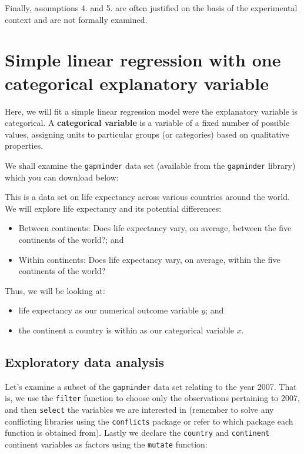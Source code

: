 \documentclass[
  letterpaper,
  DIV=11,
  numbers=noendperiod]{scrartcl}
\providecommand{\tightlist}{%
  \setlength{\itemsep}{0pt}\setlength{\parskip}{0pt}}\usepackage{longtable,booktabs,array}
\begin{document}
Finally, assumptions 4. and 5. are often justified on the basis of the
experimental context and are not formally examined.

\section{Simple linear regression with one categorical explanatory
variable}\label{simple-linear-regression-with-one-categorical-explanatory-variable}

Here, we will fit a simple linear regression model were the explanatory
variable is categorical. A \textbf{categorical variable} is a variable
of a fixed number of possible values, assigning units to particular
groups (or categories) based on qualitative properties.

We shall examine the \texttt{gapminder} data set (available from the
\texttt{gapminder} library) which you can download below:

This is a data set on life expectancy across various countries around
the world. We will explore life expectancy and its potential
differences:

\begin{itemize}
\tightlist
\item
  Between continents: Does life expectancy vary, on average, between the
  five continents of the world?; and
\item
  Within continents: Does life expectancy vary, on average, within the
  five continents of the world?
\end{itemize}

Thus, we will be looking at:

\begin{itemize}
\tightlist
\item
  life expectancy as our numerical outcome variable \(y\); and
\item
  the continent a country is within as our categorical variable \(x\).
\end{itemize}

\subsection{Exploratory data
analysis}\label{exploratory-data-analysis-1}

Let's examine a subset of the \texttt{gapminder} data set relating to
the year 2007. That is, we use the \texttt{filter} function to choose
only the observations pertaining to 2007, and then \texttt{select} the
variables we are interested in (remember to solve any conflicting
libraries using the \texttt{conflicts} package or refer to which package
each function is obtained from). Lastly we declare the \texttt{country}
and \texttt{continent} continent variables as factors using the
\texttt{mutate} function:
\end{document}

